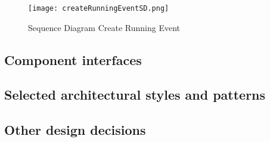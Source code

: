 \documentclass[../main.tex]{subfiles}
\begin{document}
\begin{figure}[h]
        \centering
             \texttt{[image: createRunningEventSD.png]}
              \caption{Sequence Diagram Create Running Event }
               \label{fig:createRunningEventSD}
\end{figure}


\subsection{Component interfaces}

\subsection{Selected architectural styles and patterns}

\subsection{Other design decisions}
\end{document}
